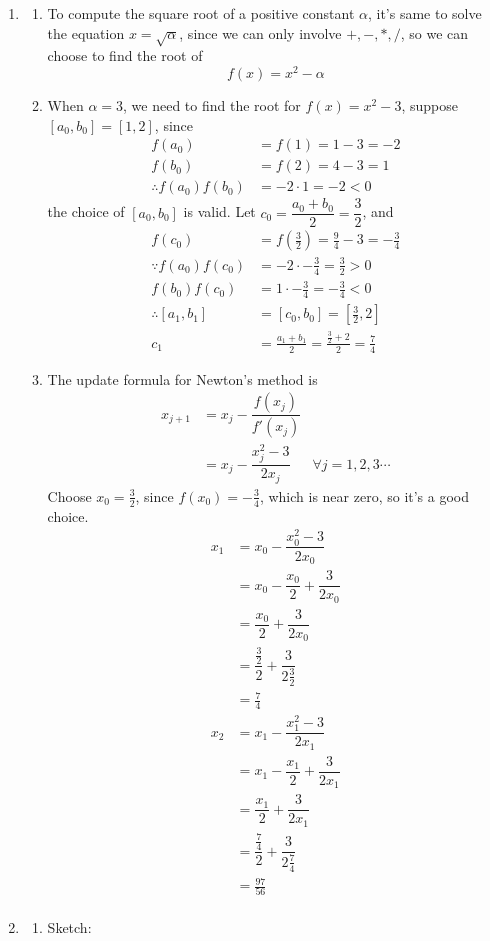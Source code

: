 \documentclass{article}
\begin{document}
\begin{enumerate}
\item
\begin{enumerate}
\item
To compute the square root of a positive constant $\alpha$, it's same to solve the equation $x = \sqrt{\alpha}$, since we can only involve $+,-,*,/$, so we can choose to find the root of\[f(x) = x^2 -\alpha\] 
\item
When $\alpha =3$, we need to find the root for $f(x) = x^2-3$,  suppose $[a_0,b_0] = [1,2]$, since \begin{align*}
f(a_0) &= f(1) = 1-3 =-2\\
f(b_0) &= f(2) = 4 -3 =1\\
\therefore f(a_0)f(b_0) &= -2\cdot 1 =-2 <0
\end{align*}
the choice of $[a_0,b_0]$ is valid.
Let $c_0 = \dfrac{a_0+b_0}{2} = \dfrac{3}{2}$, and\begin{align*}
f(c_0) &= f\left(\frac{3}{2}\right) = \frac{9}{4} -3 = -\frac{3}{4}\\
\because f(a_0)f(c_0) &= -2 \cdot -\frac{3}{4} = \frac{3}{2}>0\\
f(b_0)f(c_0) &= 1 \cdot -\frac{3}{4} = -\frac{3}{4} <0\\
\therefore [a_1,b_1] &= [c_0, b_0] = \left[\frac{3}{2}, 2\right]\\
c_1&=\frac{a_1+b_1}{2} = \frac{\frac{3}{2}+2}{2} =\frac{7}{4}
\end{align*}

\item
The update formula for Newton's method is \begin{align*}
x_{j+1}&= x_j-\dfrac{f(x_j)}{f'(x_j)}\\
&=x_j -\dfrac{x_j^2-3}{2x_j}
& \forall j = 1,2,3\cdots
\end{align*}
Choose $x_0 = \frac{3}{2}$, since $f(x_0)= -\frac{3}{4}$, which is near zero, so it's a good choice.
\begin{align*}
x_{1}&=x_0 -\dfrac{x_0^2-3}{2x_0}\\
&=x_0-\dfrac{x_0}{2}+\dfrac{3}{2x_0}\\
&=\dfrac{x_0}{2}+\dfrac{3}{2x_0}\\
&=\dfrac{\frac{3}{2}}{2}+\dfrac{3}{2\frac{3}{2}}\\
&=\frac{7}{4}\\
x_{2}&=x_1 -\dfrac{x_1^2-3}{2x_1}\\
&=x_1-\dfrac{x_1}{2}+\dfrac{3}{2x_1}\\
&=\dfrac{x_1}{2}+\dfrac{3}{2x_1}\\
&=\dfrac{\frac{7}{4}}{2}+\dfrac{3}{2\frac{7}{4}}\\
&=\frac{97}{56}\\
\end{align*}
\end{enumerate}
\item
\begin{enumerate}
\item
Sketch:


\end{enumerate}
\end{enumerate}
\end{document}
